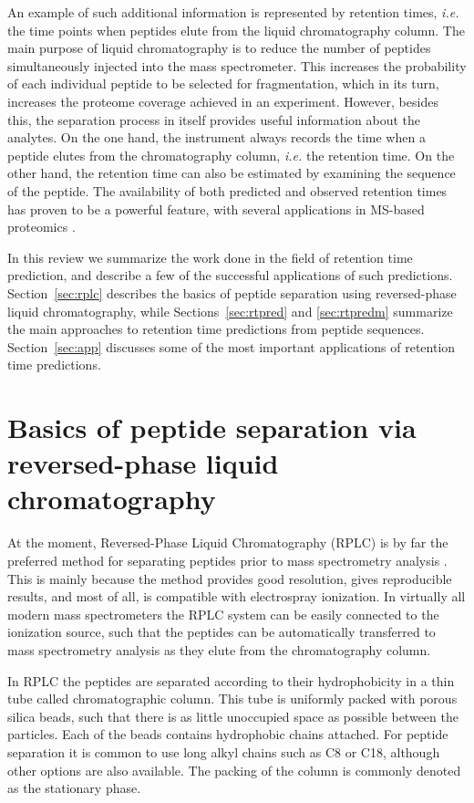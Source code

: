 \documentclass[a4paper]{article}
\begin{document}
An example of such additional information is represented by retention
times, {\em i.e.} the time points when peptides elute from the liquid
chromatography column.  The main purpose of liquid chromatography is
to reduce the number of peptides simultaneously injected into the mass
spectrometer. This increases the probability of each individual
peptide to be selected for fragmentation, which in its turn, increases
the proteome coverage achieved in an experiment.  However, besides
this, the separation process in itself provides useful information
about the analytes. On the one hand, the instrument always records the
time when a peptide elutes from the chromatography column, {\em i.e.}
the retention time. On the other hand, the retention time can also be
estimated by examining the sequence of the peptide. The availability
of both predicted and observed retention times has proven to be a
powerful feature, with several applications in MS-based proteomics
\cite{Palmblad2013}.

In this review we summarize the work done in the field of retention
time prediction, and describe a few of the successful applications of
such predictions. Section~\ref{sec:rplc} describes the basics of
peptide separation using reversed-phase liquid chromatography, while
Sections~\ref{sec:rtpred} and \ref{sec:rtpredm} summarize the main
approaches to retention time predictions from peptide
sequences. Section~\ref{sec:app} discusses some of the most important
applications of retention time predictions.


\section{\label{sec:rplc}Basics of peptide separation via reversed-phase liquid chromatography}

At the moment, Reversed-Phase Liquid Chromatography (RPLC) is by far
the preferred method for separating peptides prior to mass
spectrometry analysis \cite{Xie201278}. This is mainly because the
method provides good resolution, gives reproducible results, and most
of all, is compatible with electrospray ionization. In virtually all
modern mass spectrometers the RPLC system can be easily connected to
the ionization source, such that the peptides can be automatically
transferred to mass spectrometry analysis as they elute from the
chromatography column.

In RPLC the peptides are separated according to their hydrophobicity
in a thin tube called chromatographic column. This tube is uniformly
packed with porous silica beads, such that there is as little
unoccupied space as possible between the particles. Each of the beads
contains hydrophobic chains attached. For peptide separation it is
common to use long alkyl chains such as C8 or C18, although other
options are also available. The packing of the column is commonly
denoted as the stationary phase.
\end{document}
